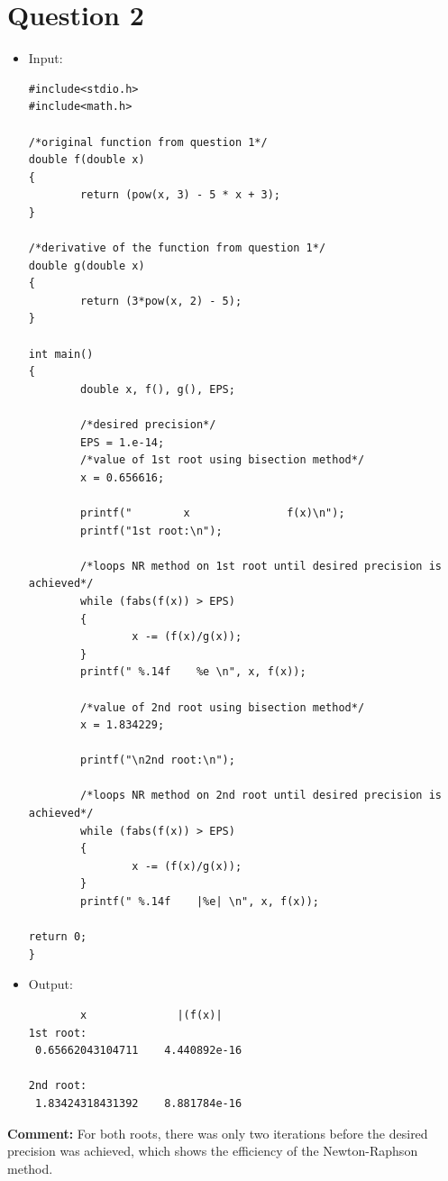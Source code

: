\documentclass[10pt]{article}
\begin{document}
\section{Question 2}
\begin{itemize}
\item Input:
\begin{verbatim}
#include<stdio.h>
#include<math.h>

/*original function from question 1*/
double f(double x)
{
        return (pow(x, 3) - 5 * x + 3);
}

/*derivative of the function from question 1*/
double g(double x)
{
        return (3*pow(x, 2) - 5);
}

int main()
{
        double x, f(), g(), EPS;

        /*desired precision*/
        EPS = 1.e-14;
        /*value of 1st root using bisection method*/
        x = 0.656616;
        
        printf("        x               f(x)\n");
        printf("1st root:\n");

        /*loops NR method on 1st root until desired precision is achieved*/
        while (fabs(f(x)) > EPS)
        {
                x -= (f(x)/g(x));
        }
        printf(" %.14f    %e \n", x, f(x));
        
        /*value of 2nd root using bisection method*/
        x = 1.834229;
        
        printf("\n2nd root:\n");
        
        /*loops NR method on 2nd root until desired precision is achieved*/
        while (fabs(f(x)) > EPS)
        {
                x -= (f(x)/g(x));
        }
        printf(" %.14f    |%e| \n", x, f(x));

return 0;
}
\end{verbatim}
\item Output:
\begin{verbatim}
        x              |(f(x)|
1st root:
 0.65662043104711    4.440892e-16 

2nd root:
 1.83424318431392    8.881784e-16 
\end{verbatim}
\end{itemize}
\textbf{Comment:} For both roots, there was only two iterations before the desired precision was achieved, which shows the efficiency of the Newton-Raphson method.

\end{document}
